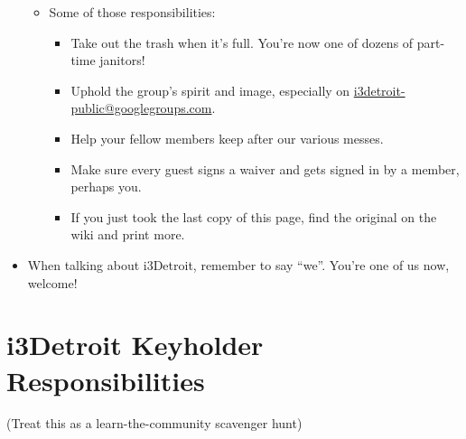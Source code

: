 \documentclass[10pt,letterpaper]{article}
\begin{document}
\begin{itemize}
\begin{itemize}
\begin{itemize}
                \end{itemize}
                \item Some of those responsibilities:
                \begin{itemize}
                    \item Take out the trash when it's full. You're now one of dozens of part-time janitors!
                    \item Uphold the group's spirit and image, especially on \href{mailto:i3detroit-public@googlegroups.com}{i3detroit-public@googlegroups.com}.
                    \item Help your fellow members keep after our various messes.
                    \item Make sure every guest signs a waiver and gets signed in by a member, perhaps you.
                    \item If you just took the last copy of this page, find the original on the wiki and print more.
                \end{itemize}
            \end{itemize}
        \item When talking about i3Detroit, remember to say ``we''. You're one of us now, welcome!
    \end{itemize}

\newpage

    \section*{\centering i3Detroit Keyholder Responsibilities}
    \centering (Treat this as a learn-the-community scavenger hunt)
\end{document}
